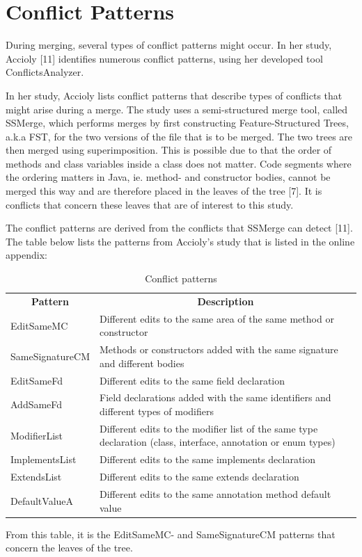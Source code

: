 \section{Conflict Patterns}
During merging, several types of conflict patterns might occur. In her study, Accioly [11] identifies numerous conflict patterns, using her developed tool ConflictsAnalyzer.

In her study, Accioly lists conflict patterns that describe types of conflicts that might arise during a merge. The study uses a semi-structured merge tool, called SSMerge, which performs merges by first constructing Feature-Structured Trees, a.k.a FST, for the two versions of the file that is to be merged. The two trees are then merged using superimposition. This is possible due to that the order of methods and class variables inside a class does not matter. Code segments where the ordering matters in Java, ie. method- and constructor bodies, cannot be merged this way and are therefore placed in the leaves of the tree [7]. It is conflicts that concern these leaves that are of interest to this study.

The conflict patterns are derived from the conflicts that SSMerge can detect [11]. The table below lists the patterns from Accioly’s study that is listed in the online appendix:\\ %
\begin{table}
\begin{tabular}{| l | p{12cm} |}
\hline
\multicolumn{1}{c}{\textbf{Pattern}} & \multicolumn{1}{c}{\textbf{Description}}\\
EditSameMC & Different edits to the same area of the same method or constructor\\
SameSignatureCM & Methods or constructors added with the same signature and different bodies\\
EditSameFd & Different edits to the same field declaration\\
AddSameFd & Field declarations added with the same identifiers and different types of modifiers\\
ModifierList & Different edits to the modifier list of the same type declaration (class, interface, annotation or enum types)\\
ImplementsList & Different edits to the same implements declaration\\
ExtendsList & Different edits to the same extends declaration\\
DefaultValueA & Different edits to the same annotation method default value
\end{tabular}
\caption{Conflict patterns}\label{table:conflictpatterns}
\end{table}
From this table, it is the EditSameMC- and SameSignatureCM patterns that concern the leaves of the tree.




